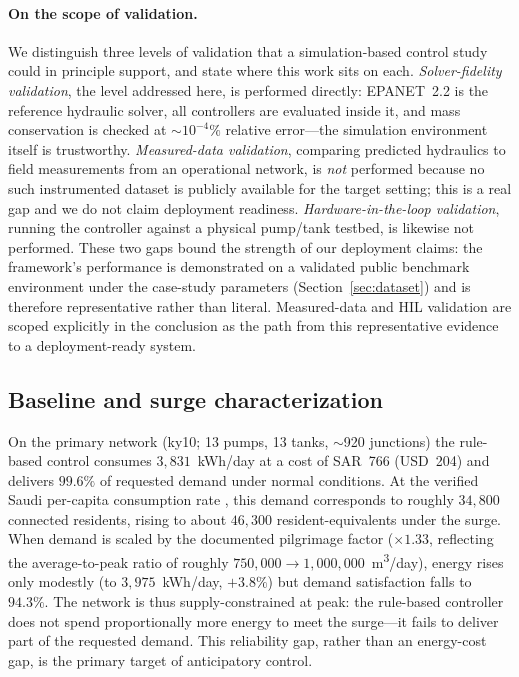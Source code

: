 \documentclass[11pt,a4paper]{article}
\begin{document}
\paragraph{On the scope of validation.} We distinguish three levels of validation
that a simulation-based control study could in principle support, and state where
this work sits on each. \emph{Solver-fidelity validation}, the level addressed
here, is performed directly: EPANET~2.2 is the reference hydraulic solver, all
controllers are evaluated inside it, and mass conservation is checked at
$\sim\!10^{-4}\%$ relative error---the simulation environment itself is
trustworthy. \emph{Measured-data validation}, comparing predicted hydraulics to
field measurements from an operational network, is \emph{not} performed because
no such instrumented dataset is publicly available for the target setting; this
is a real gap and we do not claim deployment readiness. \emph{Hardware-in-the-loop
validation}, running the controller against a physical pump/tank testbed, is
likewise not performed. These two gaps bound the strength of our deployment
claims: the framework's performance is demonstrated on a validated public
benchmark environment under the case-study parameters (Section~\ref{sec:dataset})
and is therefore representative rather than literal. Measured-data and HIL validation are scoped
explicitly in the conclusion as the path from this representative evidence to a
deployment-ready system.

\subsection{Baseline and surge characterization}
On the primary network (ky10; 13 pumps, 13 tanks, $\sim$920 junctions) the
rule-based control consumes $3{,}831$~kWh/day at a cost of SAR~766 (USD~204) and
delivers $99.6\%$ of requested demand under normal conditions. At the verified
Saudi per-capita consumption rate \citep{KAPSARC_WaterConsumption}, this demand
corresponds to roughly
$34{,}800$ connected residents, rising to about $46{,}300$ resident-equivalents
under the surge. When demand is scaled by the documented pilgrimage factor
($\times1.33$, reflecting the average-to-peak ratio of roughly
$750{,}000\to1{,}000{,}000$~m\textsuperscript{3}/day), energy rises only modestly
(to $3{,}975$~kWh/day, $+3.8\%$) but demand satisfaction falls to $94.3\%$. The
network is thus supply-constrained at peak: the rule-based controller does not
spend proportionally more energy to meet the surge---it fails to deliver part of
the requested demand. This reliability gap, rather than an energy-cost gap, is
the primary target of anticipatory control.
\end{document}
